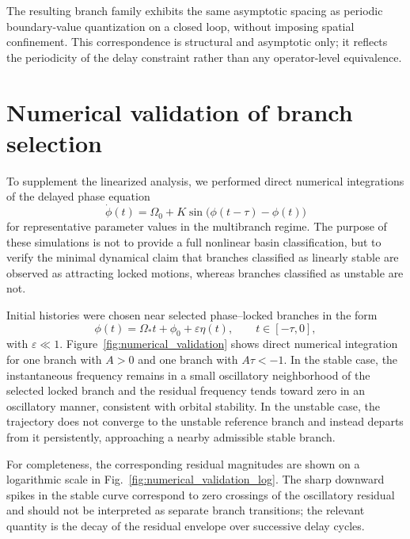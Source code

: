 \documentclass[11pt,a4paper]{article}
\begin{document}
        The resulting branch family exhibits the same asymptotic spacing as periodic boundary-value quantization on a closed loop, without imposing spatial confinement. This correspondence is structural and asymptotic only; it reflects the periodicity of the delay constraint rather than any operator-level equivalence.
    
    \section{Numerical validation of branch selection}
    \label{sec:numerics}

    To supplement the linearized analysis, we performed direct numerical integrations of the delayed phase equation
    \begin{equation}
        \dot{\phi}(t) = \Omega_0 + K \sin\big(\phi(t-\tau)-\phi(t)\big)
    \end{equation}
    for representative parameter values in the multibranch regime. The purpose of these simulations is not to provide a full nonlinear basin classification, but to verify the minimal dynamical claim that branches classified as linearly stable are observed as attracting locked motions, whereas branches classified as unstable are not.

    Initial histories were chosen near selected phase--locked branches in the form
    \begin{equation}
        \phi(t)=\Omega_\ast t+\phi_0+\varepsilon \eta(t),
        \qquad
        t\in[-\tau,0],
    \end{equation}
    with $\varepsilon\ll1$. Figure~\ref{fig:numerical_validation} shows direct numerical integration for one branch with $A>0$ and one branch with $A\tau<-1$. In the stable case, the instantaneous frequency remains in a small oscillatory neighborhood of the selected locked branch and the residual frequency tends toward zero in an oscillatory manner, consistent with orbital stability. In the unstable case, the trajectory does not converge to the unstable reference branch and instead departs from it persistently, approaching a nearby admissible stable branch.

    For completeness, the corresponding residual magnitudes are shown on a logarithmic scale in Fig.~\ref{fig:numerical_validation_log}. The sharp downward spikes in the stable curve correspond to zero crossings of the oscillatory residual and should not be interpreted as separate branch transitions; the relevant quantity is the decay of the residual envelope over successive delay cycles.
\end{document}
